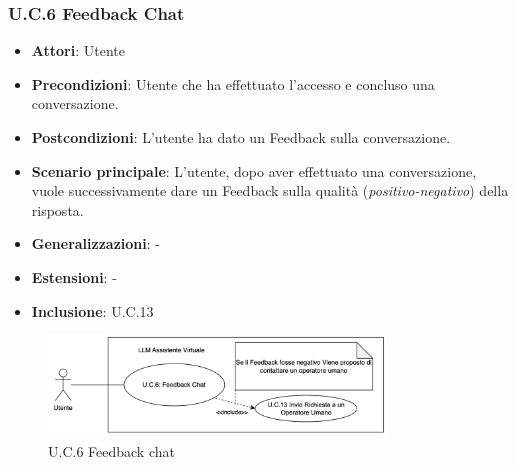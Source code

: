 \subsubsection{U.C.6 Feedback Chat}
\begin{itemize}
    \item \textbf{Attori}: Utente
    \item \textbf{Precondizioni}: Utente che ha effettuato l'accesso e concluso una conversazione.
    \item \textbf{Postcondizioni}: L'utente ha dato un Feedback sulla conversazione.
    \item \textbf{Scenario principale}: L'utente, dopo aver effettuato una conversazione, vuole successivamente dare un Feedback sulla qualità (\textit{positivo-negativo}) della risposta.
    \item \textbf{Generalizzazioni}: -
    \item \textbf{Estensioni}: -
    \item \textbf{Inclusione}: U.C.13
\end{itemize}
\begin{figure}[H]
    \centering
    \includegraphics[width=0.8\textwidth]{img/UC6.png}
    \caption{U.C.6 Feedback chat}
\end{figure}
